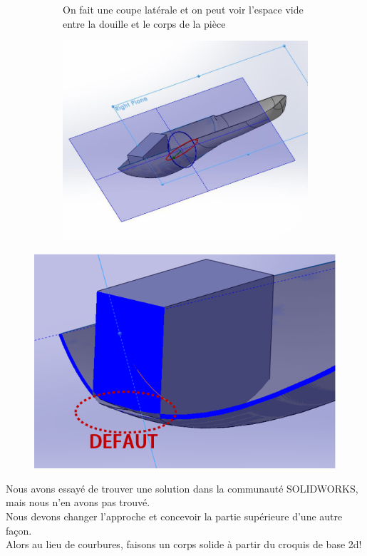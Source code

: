 \begin{figure}[!htbp]
    \centering
    \begin{subfigure}[m]{.2\linewidth}
       On fait une coupe latérale et on peut voir l’espace vide entre la douille et le corps de la pièce
    \end{subfigure}
    \hfill
    \begin{subfigure}{.75\linewidth}
        \centering
        \includegraphics[width=\linewidth]{assets/conception1/img261.jpg}
    \end{subfigure}
\end{figure}

\begin{figure}[!htbp]
    \centering
    \includegraphics[width=.7\linewidth]{assets/conception1/17.png}
\end{figure}

\FloatBarrier

Nous avons essayé de trouver une solution dans la communauté SOLIDWORKS, mais nous n’en avons pas trouvé. \\
Nous devons changer l’approche et concevoir la partie supérieure d’une autre façon. \\
Alors au lieu de courbures, faisons un corps solide à partir du croquis de base 2d! \\

